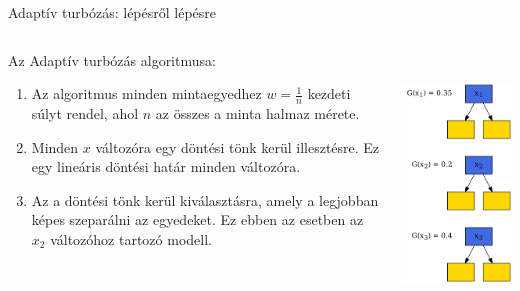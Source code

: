 \documentclass[english, aspectratio=169]{beamer}
\begin{document}
\begin{frame}{Adaptív turbózás: lépésről lépésre}
\begin{columns}
\begin{column}{.5\textwidth}
Az Adaptív turbózás algoritmusa:
\begin{enumerate}
	\item Az algoritmus minden mintaegyedhez $w=\frac{1}{n}$ kezdeti súlyt rendel, ahol $n$ az összes a minta halmaz mérete.
	\item Minden $x$ változóra egy döntési tönk kerül illesztésre. Ez egy lineáris döntési határ minden változóra. 
	\item Az a döntési tönk kerül kiválasztásra, amely a legjobban képes szeparálni az egyedeket. Ez ebben az esetben az $x_2$ változóhoz tartozó modell. 
\end{enumerate}
\end{column}
\begin{column}{.5\textwidth}
\begin{center}
\includegraphics[width=7cm, height=7cm, keepaspectratio]{graphs/ensemble_1.png}
\end{center}
\end{column}
\end{columns}
\end{frame}
\end{document}
